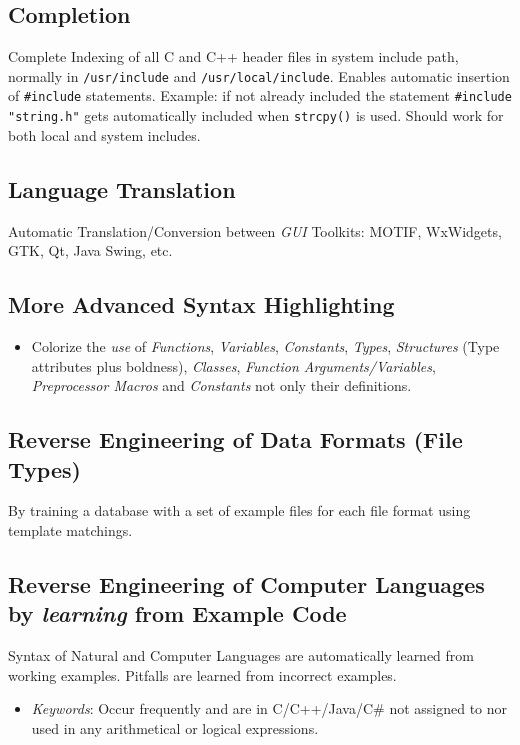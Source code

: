 \documentclass[a4paper,10pt,twocolumn]{article}
\begin{document}
\subsection{Completion}

Complete Indexing of all C and C++ header files in system include path, normally
in \texttt{/usr/include} and \texttt{/usr/local/include}.  Enables automatic
insertion of \texttt{\#include} statements.  Example: if not already included
the statement \texttt{\#include \texttt{{}"{}}string.h\texttt{{}"{}}} gets
automatically included when \texttt{strcpy()} is used. Should work for both
local and system includes.

\subsection{Language Translation}

Automatic Translation/Conversion between \emph{GUI} Toolkits: MOTIF,
  WxWidgets, GTK, Qt, Java Swing, etc.

\subsection{More Advanced Syntax Highlighting}

\begin{itemize}
\item Colorize the \emph{use} of \emph{Functions}, \emph{Variables},
  \emph{Constants}, \emph{Types}, \emph{Structures} (Type attributes plus
  boldness), \emph{Classes}, \emph{Function Arguments/Variables},
  \emph{Preprocessor Macros} and \emph{Constants} not only their definitions.
\end{itemize}

\subsection{Reverse Engineering of Data Formats (File Types)}

By training a database with a set of example files for each file format using
template matchings.

\subsection{Reverse Engineering of Computer Languages by \emph{learning} from Example Code}

Syntax of Natural and Computer Languages are automatically learned from working
examples. Pitfalls are learned from incorrect examples.
\begin{itemize}
\item \emph{Keywords}: Occur frequently and are in C/C++/Java/C\# not assigned
  to nor used in any arithmetical or logical expressions.
\end{itemize}
\end{document}
